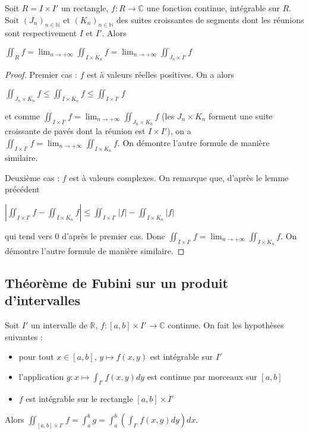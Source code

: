   \begin{lem}
  Soit $R = I \times I'$ un rectangle, $f : R \to \mathbb{C}$ une fonction continue, intégrable sur $R$. Soit $(J_n)_{n \in \mathbb{N}}$ et $(K_n)_{n \in \mathbb{N}}$ des suites croissantes de segments dont les réunions sont respectivement $I$ et $I'$. Alors
  
  $\iint_R f = \lim_{n \to +\infty} \iint_{I \times K_n} f = \lim_{n \to +\infty} \iint_{J_n \times I'} f$
  \end{lem}
  
  \begin{proof}
  Premier cas : $f$ est à valeurs réelles positives. On a alors
  
  $\iint_{J_n \times K_n} f \leq \iint_{I \times K_n} f \leq \iint_{I \times I'} f$
  
  et comme $\iint_{I \times I'} f = \lim_{n \to +\infty} \iint_{J_n \times K_n} f$ (les $J_n \times K_n$ forment une suite croissante de pavés dont la réunion est $I \times I'$), on a $\iint_{I \times I'} f = \lim_{n \to +\infty} \iint_{I \times K_n} f$. On démontre l'autre formule de manière similaire.
  
  Deuxième cas : $f$ est à valeurs complexes. On remarque que, d'après le lemme précédent
  
  $|\iint_{I \times I'} f - \iint_{I \times K_n} f| \leq \iint_{I \times I'} |f| - \iint_{I \times K_n} |f|$
  
  qui tend vers $0$ d'après le premier cas. Donc $\iint_{I \times I'} f = \lim_{n \to +\infty} \iint_{I \times K_n} f$. On démontre l'autre formule de manière similaire.
  \end{proof}
  
  \subsection{Théorème de Fubini sur un produit d'intervalles}
  
  \begin{lem}
  Soit $I'$ un intervalle de $\mathbb{R}$, $f : [a,b] \times I' \to \mathbb{C}$ continue. On fait les hypothèses suivantes :
  \begin{itemize}
  \item pour tout $x \in [a,b]$, $y \mapsto f(x,y)$ est intégrable sur $I'$
  \item l'application $g : x \mapsto \int_{I'} f(x,y) dy$ est continue par morceaux sur $[a,b]$
  \item $f$ est intégrable sur le rectangle $[a,b] \times I'$
  \end{itemize}
  Alors $\iint_{[a,b] \times I'} f = \int_a^b g = \int_a^b \left(\int_{I'} f(x,y) dy\right) dx$.
  \end{lem}
  
